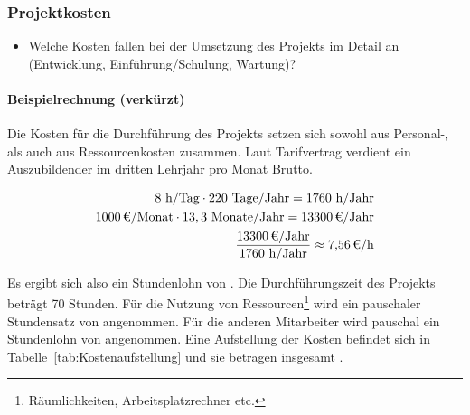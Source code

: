 \subsubsection{Projektkosten}
\label{sec:Projektkosten}
\begin{itemize}
	\item Welche Kosten fallen bei der Umsetzung des Projekts im Detail an (\zB Entwicklung, Einführung/Schulung, Wartung)?
\end{itemize}

\paragraph{Beispielrechnung (verkürzt)}
Die Kosten für die Durchführung des Projekts setzen sich sowohl aus Personal-, als auch aus Ressourcenkosten zusammen.
Laut Tarifvertrag verdient ein Auszubildender im dritten Lehrjahr pro Monat  Brutto. 

\begin{eqnarray}
8 \mbox{ h/Tag} \cdot 220 \mbox{ Tage/Jahr} = 1760 \mbox{ h/Jahr}\\
\eur{1000}\mbox{/Monat} \cdot 13,3 \mbox{ Monate/Jahr} = \eur{13300} \mbox{/Jahr}\\
\frac{\eur{13300} \mbox{/Jahr}}{1760 \mbox{ h/Jahr}} \approx \eur{7,56}\mbox{/h}
\end{eqnarray}

Es ergibt sich also ein Stundenlohn von . 
Die Durchführungszeit des Projekts beträgt 70 Stunden. Für die Nutzung von Ressourcen\footnote{Räumlichkeiten, Arbeitsplatzrechner etc.} wird 
ein pauschaler Stundensatz von  angenommen. Für die anderen Mitarbeiter wird pauschal ein Stundenlohn von  angenommen. 
Eine Aufstellung der Kosten befindet sich in Tabelle~\ref{tab:Kostenaufstellung} und sie betragen insgesamt .


